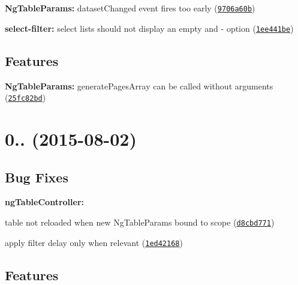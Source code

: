 \begin{DoxyItemize}
\item {\bfseries Ng\+Table\+Params\+:} dataset\+Changed event fires too early (\href{https://github.com/esvit/ng-table/commit/9706a60bc77f787afb04f01e9769c896fc63c063}{\tt 9706a60b})
\item {\bfseries select-\/filter\+:} select lists should not display an empty and \textquotesingle{}-\/\textquotesingle{} option (\href{https://github.com/esvit/ng-table/commit/1ee441bebf3e1f8fac260a38b8b82122714191d2}{\tt 1ee441be})
\end{DoxyItemize}

\subsection*{Features}


\begin{DoxyItemize}
\item {\bfseries Ng\+Table\+Params\+:} generate\+Pages\+Array can be called without arguments (\href{https://github.com/esvit/ng-table/commit/25fc82bd051b07ee9b49f105e453e7a64b462bfc}{\tt 25fc82bd})
\end{DoxyItemize}

\label{_0.8.1}%
 \section*{0.. (2015-\/08-\/02)}

\subsection*{Bug Fixes}


\begin{DoxyItemize}
\item {\bfseries ng\+Table\+Controller\+:}
\begin{DoxyItemize}
\item table not reloaded when new Ng\+Table\+Params bound to scope (\href{https://github.com/esvit/ng-table/commit/d8cbd771d11beb53cdb16e060c32cf633095d466}{\tt d8cbd771})
\item apply filter delay only when relevant (\href{https://github.com/esvit/ng-table/commit/1ed42168d59933881f11ba36047459ddfe1af442}{\tt 1ed42168})
\end{DoxyItemize}
\end{DoxyItemize}

\subsection*{Features}


